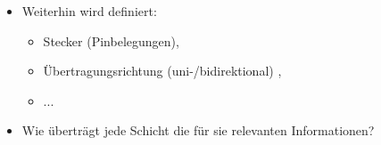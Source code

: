 \begin{itemize}
\begin{itemize}
\begin{itemize}
        \end{itemize}
        \item Weiterhin wird definiert:
        \begin{itemize}
            \item Stecker (Pinbelegungen),
            \item Übertragungsrichtung (uni-/bidirektional) ,
            \item ...
        \end{itemize}
    \end{itemize}
\end{itemize}

\begin{itemize}
    \item {} Wie überträgt jede Schicht die für sie relevanten Informationen?
\end{itemize}

